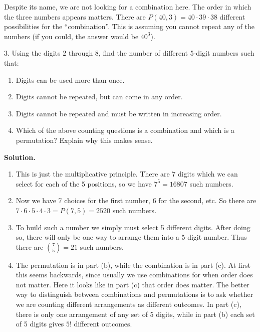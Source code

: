 \documentclass[10pt,]{book}
\theoremstyle{plain}
\theoremstyle{definition}
\theoremstyle{definition}
\theoremstyle{definition}
\numberwithin{equation}{section}
\begin{document}
\begin{exerciselist}
                Despite its name, we are not looking for a combination here. The order in which the three numbers appears matters. There are \(P(40,3) = 40\cdot 39 \cdot 38\) different possibilities for the ``combination''. This is assuming you cannot repeat any of the numbers (if you could, the answer would be \(40^3\)).
\item[3.]\hypertarget{exercise-62}{}
                Using the digits 2 through 8, find the number of different 5-digit numbers such that:
\leavevmode%
\begin{enumerate}[label=(\alph*)]
\item\hypertarget{li-472}{} Digits can be used more than once. %
\item\hypertarget{li-473}{} Digits cannot be repeated, but can come in any order. %
\item\hypertarget{li-474}{} Digits cannot be repeated and must be written in increasing order. %
\item\hypertarget{li-475}{} Which of the above counting questions is a combination and which is a permutation?  Explain why this makes sense. %
\end{enumerate}
\par\smallskip
\par\smallskip
\noindent\textbf{Solution.}\hypertarget{solution-93}{}\quad
\leavevmode%
\begin{enumerate}[label=(\alph*)]
\item\hypertarget{li-476}{} This is just the multiplicative principle.  There are 7 digits which we can select for each of the 5 positions, so we have \(7^5 = 16807\) such numbers. %
\item\hypertarget{li-477}{} Now we have 7 choices for the first number, 6 for the second, etc.  So there are \(7 \cdot 6 \cdot 5 \cdot 4 \cdot 3 = P(7,5) = 2520\) such numbers. %
\item\hypertarget{li-478}{} To build such a number we simply must select 5 different digits.  After doing so, there will only be one way to arrange them into a 5-digit number.  Thus there are \({7 \choose 5} = 21\) such numbers. %
\item\hypertarget{li-479}{} The permutation is in part (b), while the combination is in part (c).  At first this seems backwards, since usually we use combinations for when order does not matter.  Here it looks like in part (c) that order does matter.  The better way to distinguish between combinations and permutations is to ask whether we are counting different arrangements as different outcomes.  In part (c), there is only one arrangement of any set of 5 digits, while in part (b) each set of 5 digits gives \(5!\) different outcomes. %

\end{enumerate}
\end{exerciselist}
\end{document}
